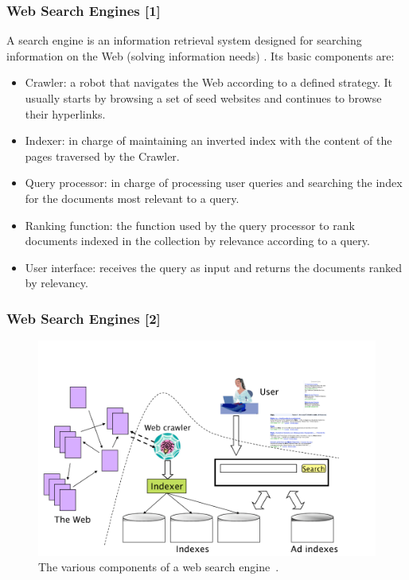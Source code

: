 \documentclass[handout]{beamer}
\begin{document}
\begin{frame}\frametitle{Web Search Engines [1]}


{\footnotesize
  A search engine is an information retrieval system designed for searching information on the Web (solving information needs) \cite{manning2008}. Its basic components are:  

\begin{block}


\begin{itemize}
\item Crawler: a robot that navigates the Web according to a defined strategy. It usually starts by browsing a set of seed websites and continues to browse their hyperlinks.
\item Indexer: in charge of maintaining an inverted index with the content of the pages traversed by the Crawler.
\item Query processor: in charge of processing user queries and searching the index for the documents most relevant to a query.
\item Ranking function: the function used by the query processor to rank documents indexed in the collection by relevance according to a query.
\item User interface: receives the query as input and returns the documents ranked by relevancy.
\end{itemize}

\end{block}
}

\end{frame}


\begin{frame}\frametitle{Web Search Engines [2]}

\begin{figure}[h!]
	\centering
	\includegraphics[scale=0.25]{pics/searchengine.png}
	\caption{ The various components of a web search engine~\cite{manning2008}.}
\end{figure}

\end{frame}
\end{document}
